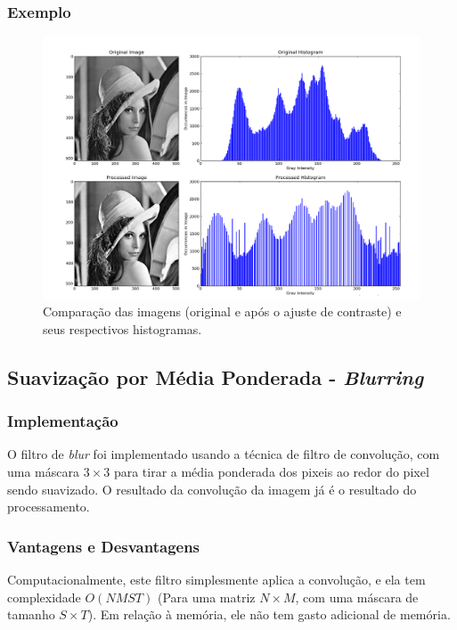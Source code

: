 \subsubsection{Exemplo}
\begin{figure}[htb]
    \centering
    \includegraphics[width=1.0\textwidth]{contrast_example.png}
    \caption{Comparação das imagens (original e após o ajuste de contraste) e seus respectivos histogramas.}
    \label{fig:ex_contraste}
\end{figure}

\pagebreak

\subsection{Suavização por Média Ponderada - \textit{Blurring}}
\subsubsection{Implementação}
O filtro de \textit{blur} foi implementado usando a técnica de filtro de convolução, com uma máscara $3\times 3$ para tirar
a média ponderada dos pixeis ao redor do pixel sendo suavizado. O resultado da convolução da imagem já é o resultado
do processamento.

\subsubsection{Vantagens e Desvantagens}
Computacionalmente, este filtro simplesmente aplica a convolução, e ela tem complexidade $O(NMST)$ (Para uma matriz 
$N\times M$, com uma máscara de tamanho $S\times T$). Em relação à memória, ele não tem gasto adicional de memória.

